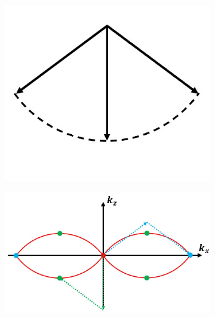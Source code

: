 \begin{figure}[h]
	\centering
	\begin{subfigure}[t]{0.35\textwidth}
		\centering
		\includegraphics[width=\linewidth]{images/amplitude_wave_vectors.jpg}
		\caption{}
		\label{fig:amplitude_wave_vectors}
	\end{subfigure}
	\begin{subfigure}[t]{0.6\textwidth}
		\centering
		\includegraphics[width=\linewidth]{images/3D_SIM_OTF_beam_pos_w_vectors.jpg}
		\caption{}
		\label{fig:3D_SIM_OTF_beam_pos_w_vectors}
	\end{subfigure}
	

\end{figure}
